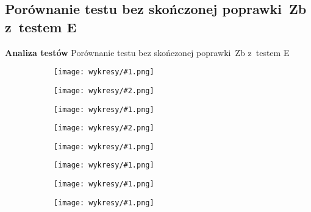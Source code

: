 \documentclass{beamer}
\newcommand{\1}[1]{\mathds{1}\left(#1\right)}
\newenvironment{subdiagrams}[2]{
	\begin{subfigure}{.35\textwidth}
		\centering
		\texttt{[image: wykresy/\#1.png]}
		\caption{}
		\label{#1}
	\end{subfigure}
	\begin{subfigure}{.35\textwidth}
		\centering
		\texttt{[image: wykresy/\#2.png]}
		\caption{}
		\label{#2}
	\end{subfigure}
} {}
\newenvironment{subdiagram}[1]{
	\begin{subfigure}{.45\textwidth}
		\centering
		\texttt{[image: wykresy/\#1.png]}
		\caption{}
		\label{#1}
	\end{subfigure}
} {}
\begin{document}
\subsection{Porównanie testu bez skończonej poprawki~Zb z~testem E}
\begin{frame}
	\begin{alertblock}{\centering \Huge \textbf{Analiza testów}} 
		\Large \centering Porównanie testu bez skończonej poprawki~Zb z~testem E
	\end{alertblock}
\end{frame}

\begin{frame}
\begin{figure}[p]
	\caption{Prawdopodobieństwo błędu I~rodzaju testów~Zb i~E jako funkcja rozmiaru próbki $n$; $\alpha=0.05$; $N_1=N_2=100$}
	\begin{subdiagrams}{sizeZbE_p_0_1}{sizeZbE_p_0_1_n1_10}
	\end{subdiagrams}
	
	\begin{subdiagrams}{sizeZbE_p_0_3}{sizeZbE_p_0_3_n1_5}
	\end{subdiagrams}
\end{figure}
\end{frame}

\begin{frame}
\begin{figure}[p]
	\caption{Moc testów~Zb i~E jako funkcja rozmiaru próbki $n$}
	\begin{subdiagram}{powerZbE_N1_30_N2_50_p_0_6}
	\end{subdiagram}
	\begin{subdiagram}{powerZbE_N_100_p_0_1}
	\end{subdiagram}
	\begin{subdiagram}{powerZbE_N1_100_N2_200_p_0_1}
	\end{subdiagram}
	\begin{subdiagram}{powerZbE_N1_3000_N2_100_p_0_6}
	\end{subdiagram}
\end{figure}
\end{frame}
\end{document}
